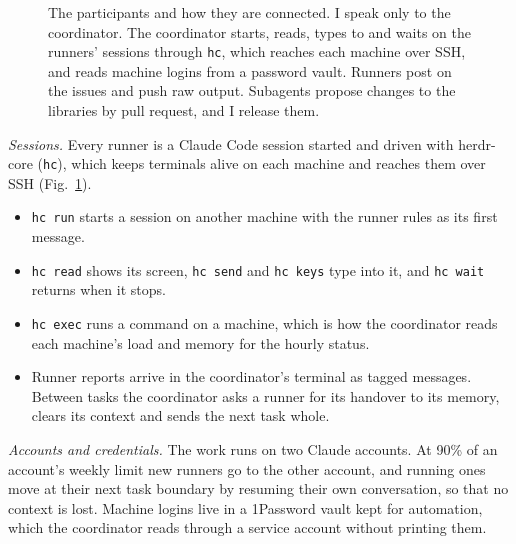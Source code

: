 \documentclass[aps,prd,onecolumn,superscriptaddress,nofootinbib,10pt]{revtex4-2}
\newcommand{\file}[1]{\texttt{#1}}
\begin{document}
\begin{figure}[t]
\caption{The participants and how they are connected. I speak only to the coordinator. The coordinator starts, reads, types
to and waits on the runners' sessions through \file{hc}, which reaches each machine over SSH, and reads machine logins
from a password vault. Runners post on the issues and push raw output. Subagents propose changes to the libraries by pull
request, and I release them.}
\label{fig:arch}
\end{figure}

\emph{Sessions.} Every runner is a Claude Code session started and driven with herdr-core (\file{hc}), which keeps
terminals alive on each machine and reaches them over SSH (Fig.~\ref{fig:arch}).
\begin{itemize}
\item \file{hc run} starts a session on another machine with the runner rules as its first message.
\item \file{hc read} shows its screen, \file{hc send} and \file{hc keys} type into it, and \file{hc wait} returns when it
stops.
\item \file{hc exec} runs a command on a machine, which is how the coordinator reads each machine's load and memory for
the hourly status.
\item Runner reports arrive in the coordinator's terminal as tagged messages. Between tasks the coordinator asks a runner
for its handover to its memory, clears its context and sends the next task whole.
\end{itemize}

\emph{Accounts and credentials.} The work runs on two Claude accounts. At 90\% of an account's weekly limit new runners
go to the other account, and running ones move at their next task boundary by resuming their own conversation, so that
no context is lost. Machine logins live in a 1Password vault kept for automation, which the coordinator reads through a
service account without printing them.
\end{document}
